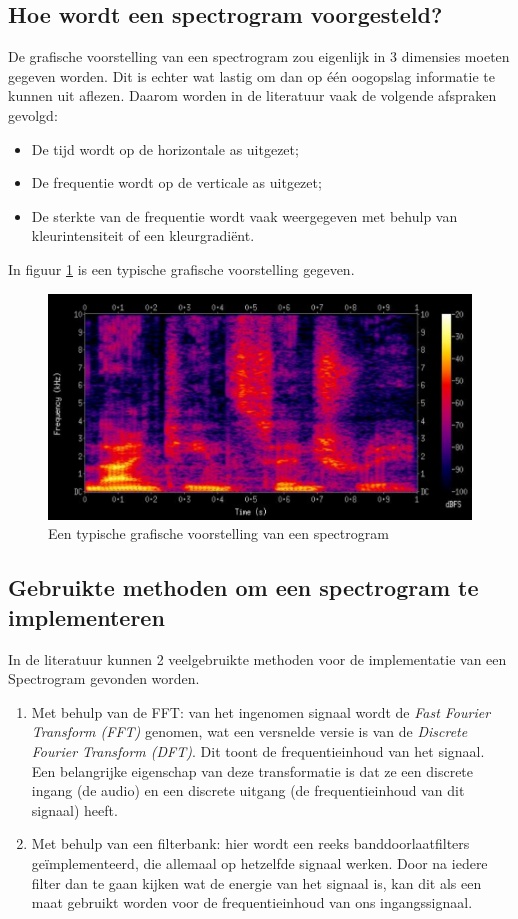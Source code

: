 \documentclass[a4paper,kul]{kulakarticle} %
\begin{document}
\subsection{Hoe wordt een spectrogram voorgesteld?}

De grafische voorstelling van een spectrogram zou eigenlijk in 3 dimensies moeten gegeven worden. Dit is echter wat lastig om dan op één oogopslag informatie te kunnen uit aflezen. Daarom worden in de literatuur vaak de volgende afspraken gevolgd:
\begin{itemize}
	\item De tijd wordt op de horizontale as uitgezet;
	\item De frequentie wordt op de verticale as uitgezet;
	\item De sterkte van de frequentie wordt vaak weergegeven met behulp van kleurintensiteit of een kleurgradiënt.
\end{itemize}
In figuur \ref{fig:typischegrafischevoorstellingspectrogram} is een typische grafische voorstelling gegeven.

\begin{figure}[H]
	\centering
	\includegraphics[width=0.7\linewidth]{typischeGrafischeVoorstellingSpectrogram.png}
	\caption{Een typische grafische voorstelling van een spectrogram}
	\label{fig:typischegrafischevoorstellingspectrogram}
\end{figure}

\subsection{Gebruikte methoden om een spectrogram te implementeren}

In de literatuur kunnen 2 veelgebruikte methoden voor de implementatie van een Spectrogram gevonden worden.
\begin{enumerate}
	\item Met behulp van de FFT: van het ingenomen signaal wordt de \textit{Fast Fourier Transform (FFT)} genomen, wat een versnelde versie is van de \textit{Discrete Fourier Transform (DFT)}. Dit toont de frequentieinhoud van het signaal. Een belangrijke eigenschap van deze transformatie is dat ze een discrete ingang (de audio) en een discrete uitgang (de frequentieinhoud van dit signaal) heeft. 
	\item Met behulp van een filterbank: hier wordt een reeks banddoorlaatfilters geïmplementeerd, die allemaal op hetzelfde signaal werken. Door na iedere filter dan te gaan kijken wat de energie van het signaal is, kan dit als een maat gebruikt worden voor de frequentieinhoud van ons ingangssignaal.
\end{enumerate}
\end{document}
